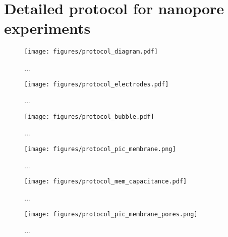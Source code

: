 \chapter{Detailed protocol for nanopore experiments}
\label{protocol}

\begin{figure}[h]
\begin{centering}
\texttt{[image: figures/protocol\_diagram.pdf]}
\caption[Schematic of patch stand]{...}
\label{fig:helicase_data}
\end{centering}
\end{figure}

\begin{figure}[h]
\begin{centering}
\texttt{[image: figures/protocol\_electrodes.pdf]}
\caption[Preparing silver chloride electrodes]{...}
\label{fig:helicase_data}
\end{centering}
\end{figure}

\begin{figure}[h]
\begin{centering}
\texttt{[image: figures/protocol\_bubble.pdf]}
\caption[Establishing a lipid membrane with a bubble]{...}
\label{fig:helicase_data}
\end{centering}
\end{figure}

\begin{figure}[h]
\begin{centering}
\texttt{[image: figures/protocol\_pic\_membrane.png]}
\caption[Diagram of membrane on Teflon patch tube]{...}
\label{fig:helicase_data}
\end{centering}
\end{figure}

\begin{figure}[h]
\begin{centering}
\texttt{[image: figures/protocol\_mem\_capacitance.pdf]}
\caption[Monitoring membrane capacitance]{...}
\label{fig:helicase_data}
\end{centering}
\end{figure}

\begin{figure}[h]
\begin{centering}
\texttt{[image: figures/protocol\_pic\_membrane\_pores.png]}
\caption[Diagram of nanopore introduction]{...}
\label{fig:helicase_data}
\end{centering}
\end{figure}

